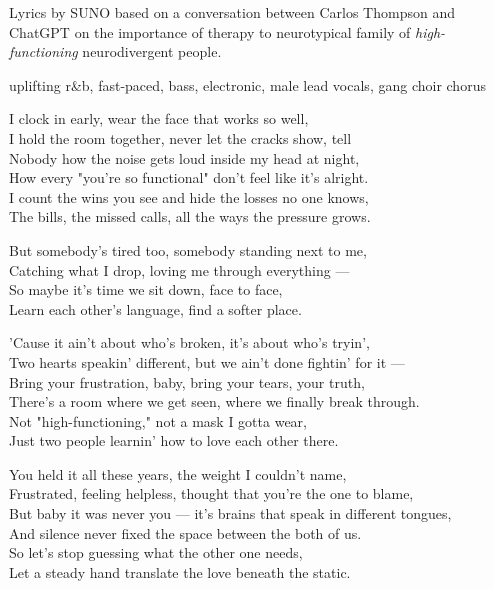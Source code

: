 
\begin{notes}
Lyrics by SUNO based on a conversation between Carlos Thompson and ChatGPT on the importance of therapy to neurotypical %
family of \emph{high-functioning} neurodivergent people.
\end{notes}
\begin{style}
uplifting r\&b, fast-paced, bass, electronic, male lead vocals, gang choir chorus
\end{style}
\begin{lyrics}
I clock in early, wear the face that works so well,\\
I hold the room together, never let the cracks show, tell\\
Nobody how the noise gets loud inside my head at night,\\
How every "you're so functional" don't feel like it's alright.\\
I count the wins you see and hide the losses no one knows,\\
The bills, the missed calls, all the ways the pressure grows.

But somebody's tired too, somebody standing next to me,\\
Catching what I drop, loving me through everything —\\
So maybe it's time we sit down, face to face,\\
Learn each other's language, find a softer place.

'Cause it ain't about who's broken, it's about who's tryin',\\
Two hearts speakin' different, but we ain't done fightin' for it —\\
Bring your frustration, baby, bring your tears, your truth,\\
There's a room where we get seen, where we finally break through.\\
Not "high-functioning," not a mask I gotta wear,\\
Just two people learnin' how to love each other there.

You held it all these years, the weight I couldn't name,\\
Frustrated, feeling helpless, thought that you're the one to blame,\\
But baby it was never you — it's brains that speak in different tongues,\\
And silence never fixed the space between the both of us.\\
So let's stop guessing what the other one needs,\\
Let a steady hand translate the love beneath the static.


\end{lyrics}
